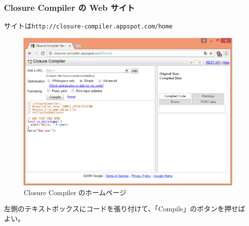 \begin{frame}[containsverbatim]
\frametitle{Closure Compiler の Web サイト}
 サイトは\texttt{http://closure-compiler.appspot.com/home}
 \begin{figure}[ht]
	\begin{center}
	 \includegraphics[width=1\textwidth]{../10-01closur-compiler-home.eps}
	\end{center}
 \caption{Closure Compiler のホームページ}\label{closure-compiler}
 \end{figure}
 左側のテキストボックスにコードを張り付けて、「Compile」のボタンを押せば
 よい。
\end{frame}
